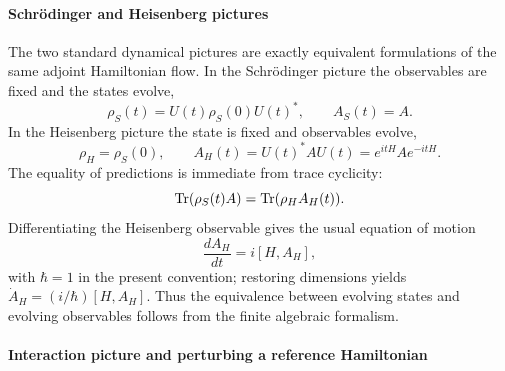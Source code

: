 \documentclass[12pt,a4paper]{article}
\begin{document}
\paragraph{Schr\"odinger and Heisenberg pictures}
\label{p4:sec:part2-sch-heis}

The two standard dynamical pictures are exactly equivalent formulations of the same adjoint Hamiltonian flow.
In the Schr\"odinger picture the observables are fixed and the states evolve,
\begin{equation}
\label{p4:eq:sch-picture}
\rho_S(t)=U(t)\rho_S(0)U(t)^*,
\qquad
A_S(t)=A.
\end{equation}
In the Heisenberg picture the state is fixed and observables evolve,
\begin{equation}
\label{p4:eq:heis-picture}
\rho_H=\rho_S(0),
\qquad
A_H(t)=U(t)^*AU(t)=e^{itH}Ae^{-itH}.
\end{equation}
The equality of predictions is immediate from trace cyclicity:
\begin{equation}
\label{p4:eq:picture-equivalence}
\operatorname{Tr}(\rho_S(t)A)=\operatorname{Tr}(\rho_H A_H(t)).
\end{equation}
Differentiating the Heisenberg observable gives the usual equation of motion
\begin{equation}
\label{p4:eq:heisenberg-equation}
\frac{dA_H}{dt}=i[H,A_H],
\end{equation}
with $\hbar=1$ in the present convention; restoring dimensions yields $\dot A_H=(i/\hbar)[H,A_H]$.
Thus the equivalence between evolving states and evolving observables follows from the finite algebraic formalism.



\paragraph{Interaction picture and perturbing a reference Hamiltonian}
\label{p4:sec:part2-interaction-picture}
\end{document}
